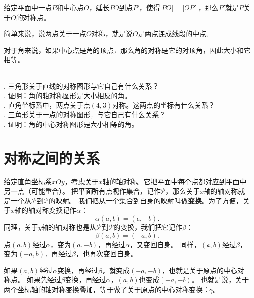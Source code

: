 \documentclass[12pt,UTF8]{ctexbook}
\begin{document}
给定平面中一点$P$和中心点$O$，延长$PO$到点$P'$，使得$|PO| = |OP'|$，那么$P'$就是$P$关于$O$的对称点。

简单来说，说两点关于一点$O$对称，就是说$O$是两点连成线段的中点。

对于角来说，如果中心点是角的顶点，那么角的对称是它的对顶角，因此大小和它相等。

\begin{sk}\label{sk:4-1-0}
    \mbox{} \\
    . 三角形关于直线的对称图形与它自己有什么关系？\\
    . 证明：角的轴对称图形是大小相反的角。\\
    . 直角坐标系中，两点关于点$(4,3)$对称。这两点的坐标有什么关系？\\
    . 三角形关于一点的对称图形，与它自己有什么关系？\\
    . 证明：角的中心对称图形是大小相等的角。
\end{sk}

\section{对称之间的关系}
给定直角坐标系$xOy$，考虑关于$x$轴的轴对称。它把平面中每个点都对应到平面中另一点（可能重合）。
把平面所有点视作集合，记作$\mathcal{P}$，那么关于$x$轴的轴对称就是一个从$\mathcal{P}$到$\mathcal{P}$的映射。
我们把从一个集合到自身的映射叫做\textbf{变换}。为了方便，关于$x$轴的轴对称变换记作$\alpha$：
$$ \alpha (a, b) = (a, -b).$$
同理，关于$y$轴的轴对称也是从$\mathcal{P}$到$\mathcal{P}$的变换，我们把它记作$\beta$：
$$ \beta (a, b) = (-a, b).$$
点$(a, b)$经过$\alpha$，变为$(a, -b)$，再经过$\alpha$，又变回自身。
同样，$(a, b)$经过$\beta$，变为$(-a, b)$，再经过$\beta$，也再次变回自身。

如果$(a, b)$经过$\alpha$变换，再经过$\beta$，就变成$(-a, -b)$，也就是关于原点的中心对称点。
如果先经过$\beta$变换，再经过$\alpha$，$(a, b)$也变成$(-a, -b)$。
也就是说，关于两个坐标轴的轴对称变换叠加，等于做了关于原点的中心对称变换：$\gamma$。
\end{document}
